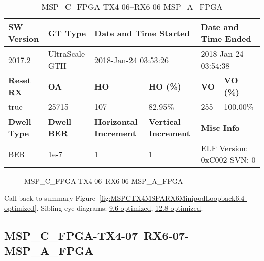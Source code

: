 \begin{table}[h]
\centering
\caption{MSP\_C\_FPGA-TX4-06--RX6-06-MSP\_A\_FPGA}
\label{tab:MSPCFPGATX406RX606MSPAFPGA6.4-optimized}
\begin{tabular}{@{}|l|l|l|l|l|l|@{}}
\toprule
\textbf{SW Version}                & \textbf{GT Type}   & \multicolumn{2}{l|}{\textbf{Date and Time Started}}            & \multicolumn{2}{l|}{\textbf{Date and Time Ended}}        \\ \midrule
2017.2                       & UltraScale GTH          & \multicolumn{2}{l|}{2018-Jan-24 03:53:26}                   & \multicolumn{2}{l|}{2018-Jan-24 03:54:38}               \\ \midrule
\textbf{Reset RX}                  & \textbf{OA} & \textbf{HO}   & \textbf{HO (\%)} & \textbf{VO} & \textbf{VO (\%)} \\ \midrule
true & 25715        & 107          & 82.95\%        & 255        & 100.00\%       \\ \midrule
\textbf{Dwell Type}                & \textbf{Dwell BER} & \textbf{Horizontal Increment} & \textbf{Vertical Increment}    & \multicolumn{2}{l|}{\textbf{Misc Info}}                  \\ \midrule
BER                            & 1e-7        & 1        & 1           & \multicolumn{2}{l|}{ELF Version: 0xC002 SVN: 0}                         \\ \bottomrule
\end{tabular}
\end{table}

\begin{figure}[h]
\caption{MSP\_C\_FPGA-TX4-06--RX6-06-MSP\_A\_FPGA} \label{fig:MSPCFPGATX406RX606MSPAFPGA6.4-optimized}
\end{figure}

Call back to summary Figure~\ref{fig:MSPCTX4MSPARX6MinipodLoopback6.4-optimized}.
Sibling eye diagrams: \hyperref[sec:MSPCFPGATX406RX606MSPAFPGA9.6-optimized]{9.6-optimized}, \hyperref[sec:MSPCFPGATX406RX606MSPAFPGA12.8-optimized]{12.8-optimized}.

\clearpage
\newpage


\subsection{MSP\_C\_FPGA-TX4-07--RX6-07-MSP\_A\_FPGA}\label{sec:MSPCFPGATX407RX607MSPAFPGA6.4-optimized}

